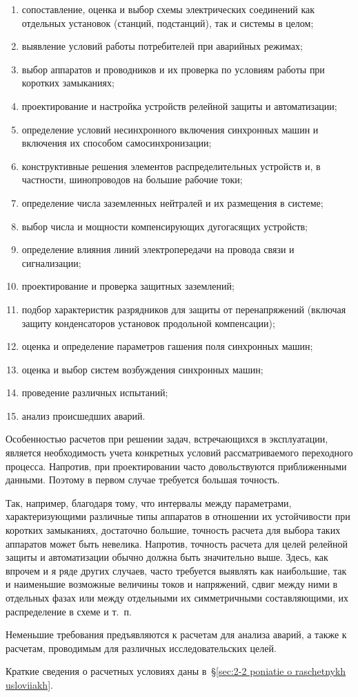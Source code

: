\begin{enumerate} 
	\item
	сопоставление, оценка и выбор схемы электрических соединений как отдельных установок (станций, подстанций), так и системы в целом;
	\item
	выявление условий работы потребителей при аварийных режимах;
	\item
	выбор аппаратов и проводников и их проверка по условиям работы при коротких замыканиях;
	\item
	проектирование и настройка устройств релейной защиты и автоматизации;
	\item
	определение условий несинхронного включения синхронных машин и включения их способом самосинхронизации;
	\item
	конструктивные решения элементов распределительных устройств и, в частности, шинопроводов на большие рабочие токи;
	\item
	определение числа заземленных нейтралей и их размещения в системе;
	\item
	выбор числа и мощности компенсирующих дугогасящих устройств;
	\item
	определение влияния линий электропередачи на провода связи и сигнализации;
	\item
	проектирование и проверка защитных заземлений;
	\item
	подбор характеристик разрядников для защиты от перенапряжений (включая защиту конденсаторов установок продольной компенсации);
	\item
	оценка и определение параметров гашения поля синхронных машин;
	\item
	оценка и выбор систем возбуждения синхронных машин;
	\item
	проведение различных испытаний;
	\item
	анализ происшедших аварий.
\end{enumerate}

Особенностью расчетов при решении задач, встречающихся в эксплуатации, является необходимость учета конкретных условий рассматриваемого переходного процесса. Напротив, при проектировании часто довольствуются приближенными данными. Поэтому в первом случае требуется большая точность.

Так, например, благодаря тому, что интервалы между параметрами, характеризующими различные типы аппаратов в отношении их устойчивости при коротких замыканиях, достаточно большие, точность расчета для выбора таких аппаратов может быть невелика. Напротив, точность расчета для целей релейной защиты и автоматизации обычно должна быть значительно выше. Здесь, как впрочем и я ряде других случаев, часто требуется выявлять как наибольшие, так и наименьшие возможные величины токов и напряжений, сдвиг между ними в отдельных фазах или между отдельными их симметричными составляющими, их распределение в схеме и т.~п.

Неменьшие требования предъявляются к расчетам для анализа аварий, а также к расчетам, проводимым для различных исследовательских целей.

Краткие сведения о расчетных условиях даны в~§\ref{sec:2-2 poniatie o raschetnykh usloviiakh}.


















